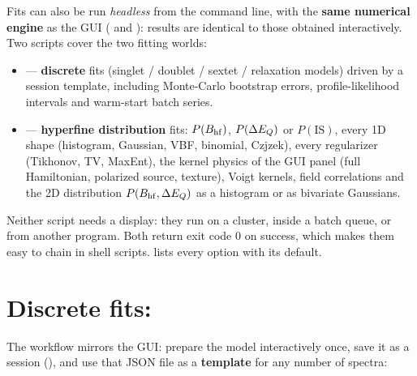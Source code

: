 
Fits can also be run \emph{headless} from the command line, with the
\textbf{same numerical engine} as the GUI ( and
): results are identical to those obtained
interactively. Two scripts cover the two fitting worlds:

\begin{itemize}[nosep]
  \item {} --- \textbf{discrete} fits
        (singlet / doublet / sextet / relaxation models) driven by a session
        template, including Monte-Carlo bootstrap errors, profile-likelihood
        intervals and warm-start batch series.
  \item {} --- \textbf{hyperfine
        distribution} fits: $P(B_{\mathrm{hf}})$, $P(\Delta E_{Q})$ or $P(\mathrm{IS})$, every 1D
        shape (histogram, Gaussian, VBF, binomial, Czjzek), every regularizer
        (Tikhonov, TV, MaxEnt), the kernel physics of the GUI panel (full
        Hamiltonian, polarized source, texture), Voigt kernels, field
        correlations and the 2D distribution $P(B_{\mathrm{hf}},\Delta E_{Q})$ as a histogram or
        as bivariate Gaussians.
\end{itemize}

Neither script needs a display: they run on a cluster, inside a batch queue,
or from another program. Both return exit code $0$ on success, which makes
them easy to chain in shell scripts.  lists every option with
its default.

\section{Discrete fits: }
\label{sec:cli-discrete}

The workflow mirrors the GUI: prepare the model interactively once, save it as
a session (), and use that JSON
file as a \textbf{template} for any number of spectra:

